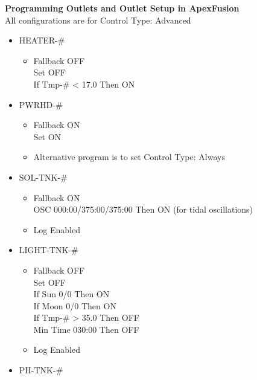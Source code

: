\documentclass[
]{book}
\providecommand{\tightlist}{%
  \setlength{\itemsep}{0pt}\setlength{\parskip}{0pt}}
\begin{document}
\textbf{Programming Outlets and Outlet Setup in ApexFusion}\\
All configurations are for Control Type: Advanced

\begin{itemize}
\tightlist
\item
  HEATER-\#

  \begin{itemize}
  \tightlist
  \item
    Fallback OFF\\
    Set OFF\\
    If Tmp-\# \textless{} 17.0 Then ON\\
  \end{itemize}
\item
  PWRHD-\#

  \begin{itemize}
  \tightlist
  \item
    Fallback ON\\
    Set ON\\
  \item
    Alternative program is to set Control Type: Always\\
  \end{itemize}
\item
  SOL-TNK-\#

  \begin{itemize}
  \tightlist
  \item
    Fallback ON\\
    OSC 000:00/375:00/375:00 Then ON (for tidal oscillations)\\
  \item
    Log Enabled\\
  \end{itemize}
\item
  LIGHT-TNK-\#

  \begin{itemize}
  \tightlist
  \item
    Fallback OFF\\
    Set OFF\\
    If Sun 0/0 Then ON\\
    If Moon 0/0 Then ON\\
    If Tmp-\# \textgreater{} 35.0 Then OFF\\
    Min Time 030:00 Then OFF\\
  \item
    Log Enabled\\
  \end{itemize}
\item
  PH-TNK-\#


\end{itemize}
\end{document}
